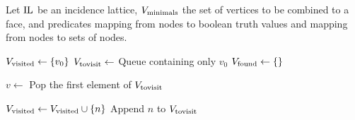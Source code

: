 \begin{algorithm}[tbp]
    Let $\operatorname{IL}$ be an incidence lattice, $V_{\textnormal{minimals}}$ the set of vertices to be combined to a face,  and  predicates mapping from nodes to boolean truth values and  mapping from nodes to sets of nodes.
    \begin{algorithmic}[1]
            \State $V_{\textnormal{visited}} \gets \left\{ v_0 \right\}$
            \State $V_{\textnormal{tovisit}} \gets$ Queue containing only $v_0$
            \State $V_{\textnormal{found}} \gets \left\{  \right\}$

                \State $v \gets$ Pop the first element of $V_{\textnormal{tovisit}}$

                            \State $V_{\textnormal{visited}} \gets V_{\textnormal{visited}} \cup \left\{ n \right\}$
                            \State Append $n$ to $V_{\textnormal{tovisit}}$
                        \EndIf
                    \EndFor
                \EndIf


\end{algorithmic}
\end{algorithm}
